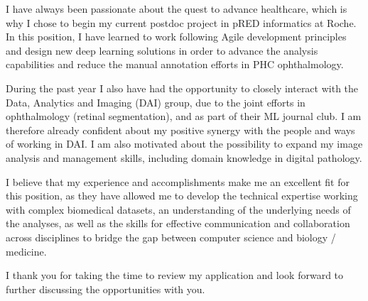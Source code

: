 \documentclass[10pt, letter]{ag-cv} %
\begin{document}
\begin{cvletter}
\begin{flushleft}
I have always been passionate about the quest to advance healthcare, which is why I chose to begin my current postdoc project in pRED informatics at Roche. In this position, I have learned to work following Agile development principles and design new deep learning solutions in order to advance the analysis capabilities and reduce the manual annotation efforts in PHC ophthalmology. 

During the past year I also have had the opportunity to closely interact with the Data, Analytics and Imaging (DAI) group, due to the joint efforts in ophthalmology (retinal segmentation), and as part of their ML journal club. I am therefore already confident about my positive synergy with the people and ways of working in DAI. I am also motivated about the possibility to expand my image analysis and management skills, including domain knowledge in digital pathology. 

I believe that my experience and accomplishments make me an excellent fit for this position, as they have allowed me to develop the technical expertise working with complex biomedical datasets, an understanding of the underlying needs of the analyses, as well as the skills for effective communication and collaboration across disciplines to bridge the gap between computer science and biology / medicine. 

I thank you for taking the time to review my application and look forward to further discussing the opportunities with you. 
\end{flushleft}

\end{cvletter}


\makeletterclosing %
\end{document}
